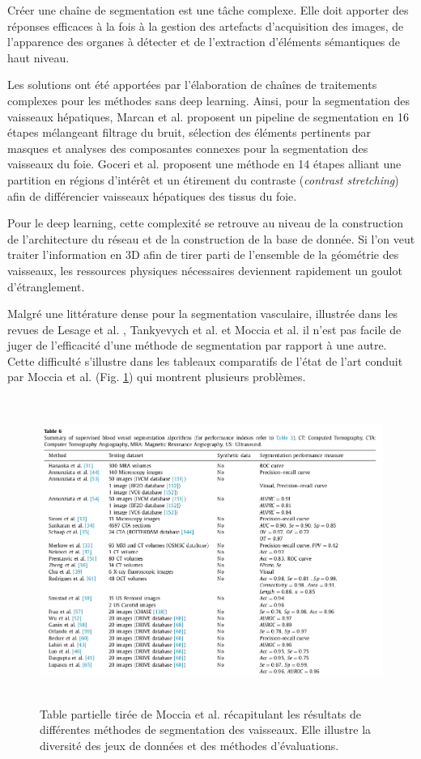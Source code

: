     Créer une chaîne de segmentation est une tâche complexe. Elle doit apporter des réponses efficaces à la fois à la gestion des artefacts d'acquisition des images, de l'apparence des organes à détecter et de l'extraction d'éléments sémantiques de haut niveau. 

    Les solutions ont été apportées par l'élaboration de chaînes de traitements complexes pour les méthodes sans deep learning. Ainsi, pour la segmentation des vaisseaux hépatiques, Marcan et al. \cite{Marcan2014_vessel_seg} proposent un pipeline de segmentation en 16 étapes mélangeant filtrage du bruit, sélection des éléments pertinents par masques et analyses des composantes connexes pour la segmentation des vaisseaux du foie. Goceri et al. \cite{Goceri2017_vessel} proposent une méthode en 14 étapes alliant une partition en régions d'intérêt et un étirement du contraste (\textit{contrast stretching}) afin de différencier vaisseaux hépatiques des tissus du foie.
  
    Pour le deep learning, cette complexité se retrouve au niveau de la construction de l'architecture du réseau et de la construction de la base de donnée. Si l'on veut traiter l'information en 3D afin de tirer parti de l'ensemble de la géométrie des vaisseaux, les ressources physiques nécessaires deviennent rapidement un goulot d'étranglement.  
    
    Malgré une littérature dense pour la segmentation vasculaire, illustrée dans les revues de Lesage et al. \cite{Lesage2009_review}, Tankyevych et al. \cite{Tankyevych2011_angiographic} et Moccia et al. \cite{Moccia2018_survey} il n'est pas facile de juger de l'efficacité d'une méthode de segmentation par rapport à une autre. Cette difficulté s'illustre dans les tableaux comparatifs de l'état de l'art conduit par  Moccia et al. (Fig. \ref{fig:moccia_table}) qui montrent plusieurs problèmes.

    \begin{figure}[h]
      \centering
      \includegraphics[height=10cm]{Images/Moccia_example.png}
      \caption{Table partielle tirée de Moccia et al. \cite{Moccia2018_survey} récapitulant les résultats de différentes méthodes de segmentation des vaisseaux. Elle illustre la diversité des jeux de données et des méthodes d'évaluations.}
      \label{fig:moccia_table}
    \end{figure}

